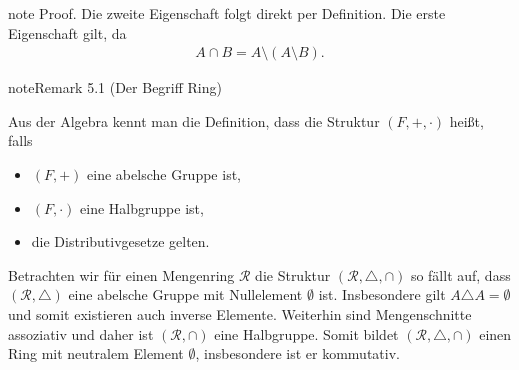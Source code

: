 \documentclass[letterpaper,10pt,german]{jupyterBook}
\begin{document}
\begin{sphinxadmonition}{note}
\sphinxAtStartPar
Proof. Die zweite Eigenschaft folgt direkt per Definition. Die erste Eigenschaft gilt, da
\begin{equation*}
\begin{split}A\cap B = A\setminus (A\setminus B).\end{split}
\end{equation*}\end{sphinxadmonition}
\label{masstheorie/masstheorie:remark-2}
\begin{sphinxadmonition}{note}{Remark 5.1 (Der Begriff Ring)}



\sphinxAtStartPar
Aus der Algebra kennt man die Definition, dass die Struktur \((F,+,\cdot)\)  heißt, falls
\begin{itemize}
\item {} 
\sphinxAtStartPar
\((F,+)\) eine abelsche Gruppe ist,

\item {} 
\sphinxAtStartPar
\((F,\cdot)\) eine Halbgruppe ist,

\item {} 
\sphinxAtStartPar
die Distributivgesetze gelten.

\end{itemize}

\sphinxAtStartPar
Betrachten wir für einen Mengenring \(\mathcal{R}\) die Struktur \((\mathcal{R}, \triangle, \cap)\) so fällt auf, dass \((\mathcal{R},\triangle)\) eine abelsche Gruppe mit Nullelement \(\emptyset\) ist. Insbesondere gilt \(A\triangle A=\emptyset\) und somit existieren auch inverse Elemente. Weiterhin sind Mengenschnitte assoziativ und daher ist \((\mathcal{R}, \cap)\) eine Halbgruppe. Somit bildet \((\mathcal{R},\triangle,\cap)\) einen Ring mit neutralem Element \(\emptyset\), insbesondere ist er kommutativ.
\end{sphinxadmonition}
\end{document}
